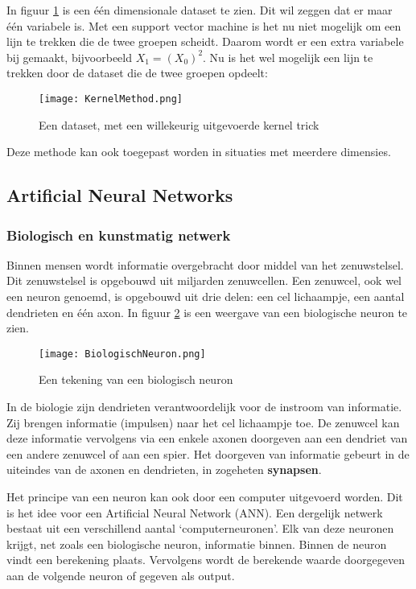 In figuur \ref{fig:SupVectorMachine2} is een \'{e}\'{e}n dimensionale dataset te zien. Dit wil zeggen dat er maar \'{e}\'{e}n variabele is. Met een support vector machine is het nu niet mogelijk om een lijn te trekken die de twee groepen scheidt. Daarom wordt er een extra variabele bij gemaakt, bijvoorbeeld $X_{1} = (X_{0})^{2}$. Nu is het wel mogelijk een lijn te trekken door de dataset die de twee groepen opdeelt:

\begin{figure}[h]
  \centering
    \texttt{[image: KernelMethod.png]}
  \caption{Een dataset, met een willekeurig uitgevoerde kernel trick}
  \label{fig:SupVectorMachine2}
\end{figure}

Deze methode kan ook toegepast worden in situaties met meerdere dimensies.

\subsection{Artificial Neural Networks}
\subsubsection{Biologisch en kunstmatig netwerk}
Binnen mensen wordt informatie overgebracht door middel van het zenuwstelsel. Dit zenuwstelsel is opgebouwd uit miljarden zenuwcellen. Een zenuwcel, ook wel een neuron genoemd, is opgebouwd uit drie delen: een cel lichaampje, een aantal dendrieten en \'{e}\'{e}n axon. In figuur \ref{fig:BiologischNeuron} is een weergave van een biologische neuron te zien.

\begin{figure}[h]
  \centering
    \texttt{[image: BiologischNeuron.png]}
  \caption{Een tekening van een biologisch neuron}
  \label{fig:BiologischNeuron}
\end{figure}

In de biologie zijn dendrieten verantwoordelijk voor de instroom van informatie. Zij brengen informatie (impulsen) naar het cel lichaampje toe. De zenuwcel kan deze informatie vervolgens via een enkele axonen doorgeven aan een dendriet van een andere zenuwcel of aan een spier. Het doorgeven van informatie gebeurt in de uiteindes van de axonen en dendrieten, in zogeheten \textbf{synapsen}.

Het principe van een neuron kan ook door een computer uitgevoerd worden. Dit is het idee voor een Artificial Neural Network (ANN). Een dergelijk netwerk bestaat uit een verschillend aantal ‘computerneuronen’. Elk van deze neuronen krijgt, net zoals een biologische neuron, informatie binnen. Binnen de neuron vindt een berekening plaats. Vervolgens wordt de berekende waarde doorgegeven aan de volgende neuron of gegeven als output.

